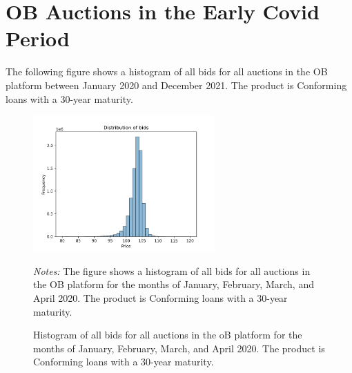\documentclass[11pt,a4paper]{article}
\begin{document}
\pagebreak
\section{OB Auctions in the Early Covid Period}

The following figure shows a histogram of all bids for all auctions in the OB platform between January 2020 and December 2021. 
The product is Conforming loans with a 30-year maturity. 



\begin{figure}[h]
    \centering
    \includegraphics[width=0.62\textwidth]{../results/figures/distribution_of_bids.png}
    \caption{Histogram of all bids for all auctions in the oB platform for the months of January, February, March, and April 2020. The product is Conforming loans with a 30-year maturity.}
    \begin{minipage}{\textwidth}
        \footnotesize{\textit{Notes:} The figure shows a histogram of all bids for all auctions in the OB platform for the months of January, February, March, and April 2020. The product is Conforming loans with a 30-year maturity. } 
        \end{minipage}
\end{figure}
\end{document}
